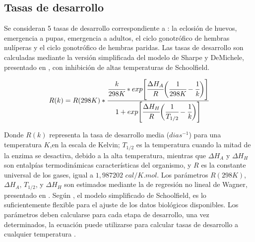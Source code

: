 \subsection{Tasas de desarrollo}
\label{subsec:cap4-tasas de desarrollo}
Se consideran 5 tasas de desarrollo correspondiente a : la eclosión de huevos,
emergencia a pupas, emergencia a adultos, el ciclo gonotrófico de hembras nulíperas y el ciclo gonotrófico de hembras paridas. Las tasas de desarrollo son calculadas mediante la versión simplificada del modelo de Sharpe y DeMichele, presentado en \cite{sharpe1977reaction},
con inhibición de altas temperaturas de Schoolfield.

\begin{equation} \label{eq:schoolfield}
   R(k)  = R(298K) *\cfrac{ \cfrac{k}{298K} *
    exp \Bigg[
            \cfrac{\Delta H_{A}}{R} \bigg(\cfrac{1}{298K} - \cfrac{1}{k}\bigg)
        \Bigg]}
    {1 + exp\Bigg[\cfrac{\Delta H_{H}}{R} \bigg(\cfrac{1}{T_{1/2}}- \cfrac{1}{k}\bigg)\Bigg] }
\end{equation}

Donde $R(k)$ representa la tasa de desarrollo media ($dias^{-1}$) para una temperatura $K$,en la
escala de Kelvin; $T_{1/2}$ es la temperatura cuando la mitad de la enzima se desactiva, debido a
la alta temperatura, mientras que $\Delta H_{A}$ y $\Delta H_{H}$  son entalpías termodinámicas características del organismo, y $R$ es la constante universal de los gases, igual a
$1,987202$ $cal/K.mol$. Los parámetros $R(298K)$, $\Delta H_{A}$, $T_{1/2}$, y $\Delta H_{H}$ son estimados mediante la de regresión no lineal de Wagner, presentado en \cite{wagner1984modeling}.
Según \cite{otero2006stochastic}, el modelo simplificado de Schoolfield, es lo suficientemente
flexible para el ajuste de los datos biológicos disponibles. Los parámetros deben calcularse para
cada etapa de desarrollo, una vez determinados, la ecuación puede utilizarse para calcular tasas
de desarrollo a cualquier temperatura \cite{rueda1990temperature}.

